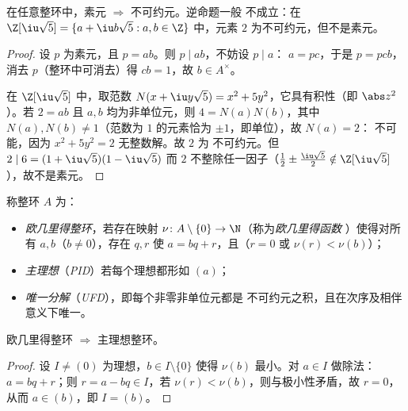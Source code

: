 \begin{proposition}\label{prop:b3:rings:primeirred}
在任意整环中，素元 $\Rightarrow$ 不可约元。逆命题一般
不成立：在 $\Z[\iu\sqrt 5] = \{a + \iu b\sqrt5 : a, b
\in \Z\}$ 中，元素 $2$ 为不可约元，但不是素元。
\end{proposition}

\begin{proof}
设 $p$ 为素元，且 $p = ab$。则 $p \mid ab$，不妨设 $p \mid a$：
$a = pc$，于是 $p = pcb$，消去 $p$（整环中可消去）得 $cb =
1$，故 $b \in A^\times$。

在 $\Z[\iu\sqrt5]$ 中，取范数 $N(x + \iu y\sqrt 5) = x^2 +
5y^2$，它具有积性（即 $\abs z^2$）。若 $2 = ab$
且 $a, b$ 均为非单位元，则 $4 = N(a)N(b)$，其中 $N(a), N(b) \neq
1$（范数为 $1$ 的元素恰为 $\pm1$，即单位），故 $N(a) = 2$：
不可能，因为 $x^2 + 5y^2 = 2$ 无整数解。故 $2$ 为
不可约元。但 $2 \mid 6 = (1 + \iu\sqrt5)(1 - \iu\sqrt5)$
而 $2$ 不整除任一因子（$\frac12 \pm \frac{\iu\sqrt5}2
\notin \Z[\iu\sqrt5]$），故不是素元。
\end{proof}

\begin{definition}\label{def:b3:rings:pidufd}
称整环 $A$ 为：
\begin{itemize}
  \item \emph{欧几里得整环}，若存在映射
        $\nu \colon A \setminus \{0\} \to \N$（称为\emph{欧几里得函数
        }）使得对所有 $a, b$（$b \ne 0$），存在
        $q, r$ 使 $a = bq + r$，且（$r = 0$ 或 $\nu(r) <
        \nu(b)$）；
  \item \emph{主理想}（\emph{PID}）若每个理想都形如 $(a)$；
  \item \emph{唯一分解}（\emph{UFD}），即每个非零非单位元都是
        不可约元之积，且在次序及相伴意义下唯一。
\end{itemize}
\end{definition}

\begin{theorem}\label{thm:b3:rings:euclideanpid}
欧几里得整环 $\Rightarrow$ 主理想整环。
\end{theorem}

\begin{proof}
设 $I \neq (0)$ 为理想，$b \in I \setminus\{0\}$ 使得
$\nu(b)$ 最小。对 $a \in I$ 做除法：$a = bq + r$；则 $r = a
- bq \in I$，若 $\nu(r) < \nu(b)$，则与极小性矛盾，故
$r = 0$，从而 $a \in (b)$，即 $I = (b)$。
\end{proof}

